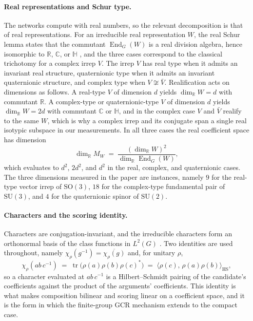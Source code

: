 \documentclass{article}
\DeclareMathOperator{\End}{End}
\newcommand{\SU}{\mathrm{SU}}
\newcommand{\SO}{\mathrm{SO}}
\newcommand{\R}{\mathbb{R}}
\newcommand{\C}{\mathbb{C}}
\newcommand{\HH}{\mathbb{H}}
\begin{document}
\paragraph{Real representations and Schur type.}
The networks compute with real numbers, so the relevant decomposition
is that of real representations. For an irreducible real representation
$W$, the real Schur lemma states that the commutant $\End_G(W)$ is a
real division algebra, hence isomorphic to $\R$, $\C$, or $\HH$
\cite[Ch.~III]{sepanski2007}, and the three cases correspond to the
classical trichotomy for a complex irrep $V$. The irrep $V$ has real
type when it admits an invariant real structure, quaternionic type when
it admits an invariant quaternionic structure, and complex type when
$V \not\cong \bar V$. Realification acts on dimensions as follows. A
real-type $V$ of dimension $d$ yields $\dim_\R W = d$ with commutant
$\R$. A complex-type or quaternionic-type $V$ of dimension $d$ yields
$\dim_\R W = 2d$ with commutant $\C$ or $\HH$, and in the complex case
$V$ and $\bar V$ realify to the same $W$, which is why a complex irrep
and its conjugate span a single real isotypic subspace in our
measurements. In all three cases the real coefficient space has
dimension
\[
\dim_\R M_W \;=\; \frac{(\dim_\R W)^2}{\dim_\R \End_G(W)},
\]
which evaluates to $d^2$, $2d^2$, and $d^2$ in the real, complex, and
quaternionic cases. The three dimensions measured in the paper are
instances, namely $9$ for the real-type vector irrep of $\SO(3)$, $18$
for the complex-type fundamental pair of $\SU(3)$, and $4$ for the
quaternionic spinor of $\SU(2)$.

\paragraph{Characters and the scoring identity.}
Characters are conjugation-invariant, and the irreducible characters
form an orthonormal basis of the class functions in $L^2(G)$
\cite[Ch.~II]{brocker1985}. Two identities are used throughout, namely
$\chi_\rho(g^{-1}) = \overline{\chi_\rho(g)}$ and, for unitary $\rho$,
\[
\chi_\rho(ab\,c^{-1})
\;=\; \operatorname{tr}\bigl(\rho(a)\rho(b)\rho(c)^{*}\bigr)
\;=\; \bigl\langle \rho(c),\, \rho(a)\rho(b) \bigr\rangle_{\mathrm{HS}},
\]
so a character evaluated at $ab\,c^{-1}$ is a Hilbert--Schmidt pairing
of the candidate's coefficients against the product of the arguments'
coefficients. This identity is what makes composition bilinear and
scoring linear on a coefficient space, and it is the form in which the
finite-group GCR mechanism extends to the compact case.
\end{document}
